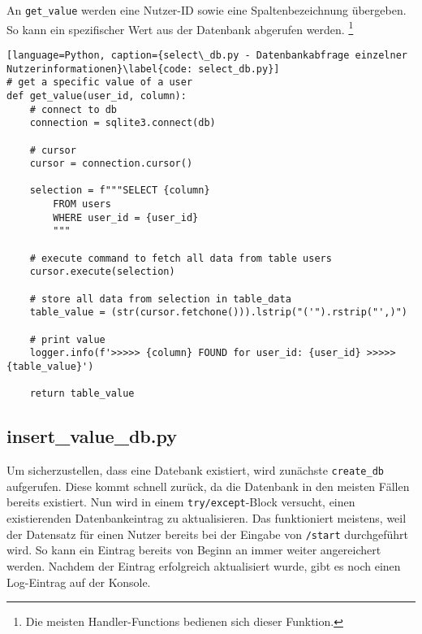                 An \verb|get_value| werden eine Nutzer-ID sowie eine Spaltenbezeichnung übergeben. So kann ein spezifischer Wert aus der Datenbank abgerufen werden. \footnote{Die meisten Handler-Functions bedienen sich dieser Funktion.} 
                \begin{lstlisting}[language=Python, caption={select\_db.py - Datenbankabfrage einzelner Nutzerinformationen}\label{code: select_db.py}]
# get a specific value of a user
def get_value(user_id, column):
    # connect to db
    connection = sqlite3.connect(db)

    # cursor
    cursor = connection.cursor()

    selection = f"""SELECT {column}
        FROM users
        WHERE user_id = {user_id}
        """

    # execute command to fetch all data from table users
    cursor.execute(selection)

    # store all data from selection in table_data
    table_value = (str(cursor.fetchone())).lstrip("('").rstrip("',)")

    # print value
    logger.info(f'>>>>> {column} FOUND for user_id: {user_id} >>>>> {table_value}')

    return table_value
                \end{lstlisting}

        \subsection{insert\_value\_db.py} \label{Implementierung: insert_value_db.py}
                Um sicherzustellen, dass eine Datebank existiert, wird zunächste \verb|create_db| aufgerufen. Diese kommt schnell zurück, da die Datenbank in den meisten Fällen bereits existiert. Nun wird in einem \verb|try/except|-Block versucht, einen existierenden Datenbankeintrag zu aktualisieren. Das funktioniert meistens, weil der Datensatz für einen Nutzer bereits bei der Eingabe von \verb|/start| durchgeführt wird. So kann ein Eintrag bereits von Beginn an immer weiter angereichert werden. Nachdem der Eintrag erfolgreich aktualisiert wurde, gibt es noch einen Log-Eintrag auf der Konsole.

